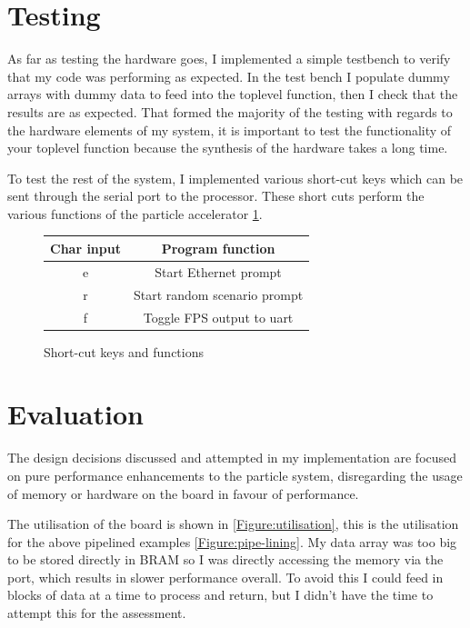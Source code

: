 \documentclass[12pt]{article} %
\begin{document}
\section{Testing}

As far as testing the hardware goes, I implemented a simple testbench to verify that my code was performing as expected. In the test bench I populate dummy arrays with dummy data to feed into the toplevel function, then I check that the results are as expected. That formed the majority of the testing with regards to the hardware elements of my system, it is important to test the functionality of your toplevel function because the synthesis of the hardware takes a long time.

To test the rest of the system, I implemented various short-cut keys which can be sent through the serial port to the processor. These short cuts perform the various functions of the particle accelerator \cref{Table:short-cuts}.

\begin{figure}[h!]
\begin{center}
\begin{tabular}{ |c|c| } 
 \hline
Char input & Program function \\
 \hline\hline
 e & Start Ethernet prompt \\ 
 \hline
 r & Start random scenario prompt \\ 
 \hline
 f & Toggle FPS output to uart \\ 
 \hline
\end{tabular}
\end{center}
	\caption{Short-cut keys and functions}
  \label{Table:short-cuts}
\end{figure}

\section{Evaluation}

The design decisions discussed and attempted in my implementation are focused on pure performance enhancements to the particle system, disregarding the usage of memory or hardware on the board in favour of performance.

The utilisation of the board is shown in \cref{Figure:utilisation}, this is the utilisation for the above pipelined examples \cref{Figure:pipe-lining}. My data array was too big to be stored directly in BRAM so I was directly accessing the memory via the port, which results in slower performance overall. To avoid this I could feed in blocks of data at a time to process and return, but I didn't have the time to attempt this for the assessment.
\end{document}
